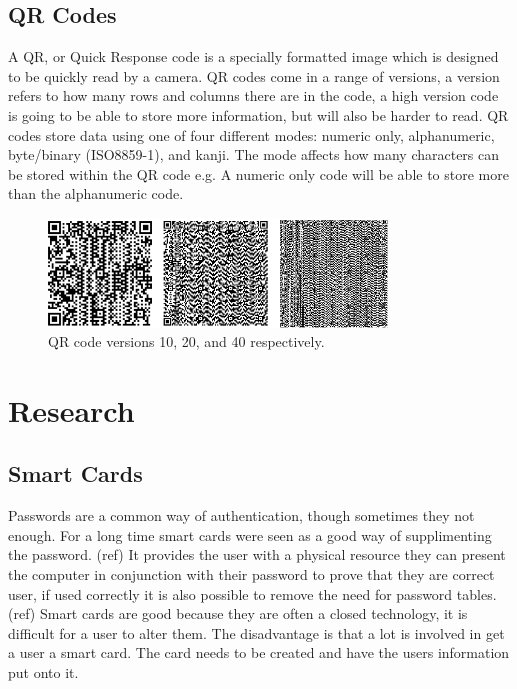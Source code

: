 \documentclass[]{report}   %
\begin{document}
\subsection{QR Codes}  
A QR, or Quick Response code \cite{QR} is a specially formatted image which is designed to be quickly read by a camera. QR codes come in a range of versions, a version refers to how many rows and columns there are in the code, a high version code is going to be able to store more information, but will also be harder to read. QR codes store data using one of four different modes: numeric only, alphanumeric, byte/binary (ISO8859-1), and kanji. The mode affects how many characters can be stored within the QR code e.g. A numeric only code will be able to store more than the alphanumeric code.

\begin{figure}[H]
\centering
\includegraphics[width=9cm]{QRCodes.png}
\caption{QR code versions 10, 20, and 40 respectively.}
\end{figure}

\section{Research}
\subsection{Smart Cards}
Passwords are a common way of authentication, though sometimes they not enough. For a long time smart cards were seen as a good way of supplimenting the password. (ref)  It provides the user with a physical resource they can present the computer in conjunction with their password to prove that they are correct user, if used correctly it is also possible to remove the need for password tables. (ref) Smart cards are good because they are often a closed technology, it is difficult for a user to alter them. The disadvantage is that a lot is involved in get a user a smart card. The card needs to be created and have the users information put onto it.
\end{document}
